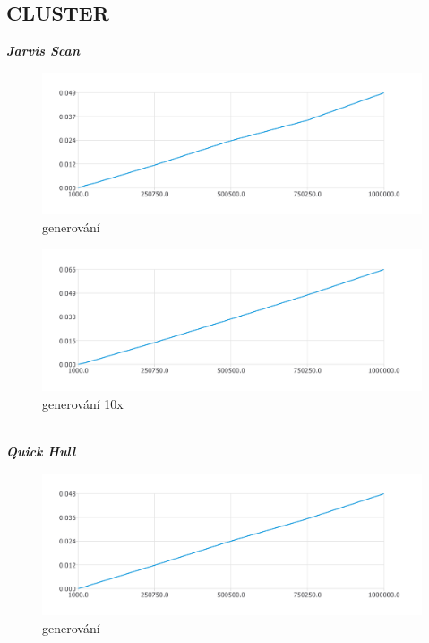 \documentclass{article}
\begin{document}
\subsection{CLUSTER}
\textit{\textbf {Jarvis Scan}}
\\
\begin{figure}[htbp]
\centering
        \includegraphics[clip, trim=0cm 0cm 0cm 0cm, width=1\textwidth]{pdf19.pdf}
        \caption{generování}
\end{figure}
\begin{figure}[htbp]
\centering
        \includegraphics[clip, trim=0cm 0cm 0cm 0cm, width=1\textwidth]{clj.pdf}
        \caption{generování 10x}
\end{figure}
\\
\clearpage
\newpage
\textit{\textbf {Quick Hull}}
\\
\begin{figure}[htbp]
\centering
        \includegraphics[clip, trim=0cm 0cm 0cm 0cm, width=1\textwidth]{pdf22.pdf}
        \caption{generování}
\end{figure}
\end{document}
